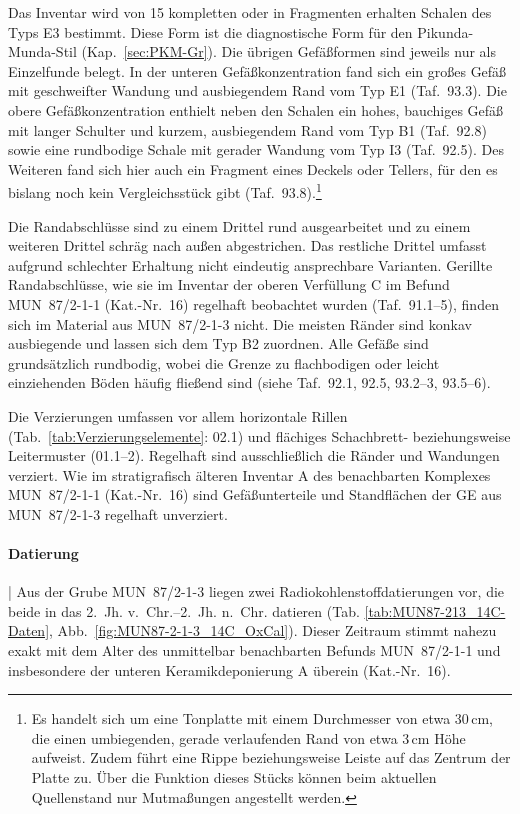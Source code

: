 Das Inventar wird von 15 kompletten oder in Fragmenten erhalten Schalen des Typs E3 bestimmt. Diese Form ist die diagnostische Form für den Pikunda-Munda-Stil (Kap.~\ref{sec:PKM-Gr}). Die übrigen Gefäßformen sind jeweils nur als Einzelfunde belegt. In der unteren Gefäßkonzentration fand sich ein großes Gefäß mit geschweifter Wandung und ausbiegendem Rand vom Typ E1 (Taf.~93.3). Die obere Gefäßkonzentration enthielt neben den Schalen ein hohes, bauchiges Gefäß mit langer Schulter und kurzem, ausbiegendem Rand vom Typ B1 (Taf.~92.8) sowie eine rundbodige Schale mit gerader Wandung vom Typ I3 (Taf.~92.5). Des Weiteren fand sich hier auch ein Fragment eines Deckels oder Tellers, für den es bislang noch kein Vergleichsstück gibt (Taf.~93.8).\footnote{Es handelt sich um eine Tonplatte mit einem Durchmesser von etwa 30\,cm, die einen umbiegenden, gerade verlaufenden Rand von etwa 3\,cm Höhe aufweist. Zudem führt eine Rippe beziehungsweise Leiste auf das Zentrum der Platte zu. Über die Funktion dieses Stücks können beim aktuellen Quellenstand nur Mutmaßungen angestellt werden.}

Die Randabschlüsse sind zu einem Drittel rund ausgearbeitet und zu einem weiteren Drittel schräg nach außen abgestrichen. Das restliche Drittel umfasst aufgrund schlechter Erhaltung nicht eindeutig ansprechbare Varianten. Gerillte Randabschlüsse, wie sie im Inventar der oberen Verfüllung C im Befund MUN~87/2-1-1 (Kat.-Nr.~16) regelhaft beobachtet wurden (Taf.~91.1--5), finden sich im Material aus MUN~87/2-1-3 nicht. Die meisten Ränder sind konkav ausbiegende und lassen sich dem Typ B2 zuordnen. Alle Gefäße sind grundsätzlich rundbodig, wobei die Grenze zu flachbodigen oder leicht einziehenden Böden häufig fließend sind (siehe Taf.~92.1, 92.5, 93.2--3, 93.5--6).

Die Verzierungen umfassen vor allem horizontale Rillen (Tab.~\ref{tab:Verzierungselemente}: 02.1) und flächiges Schachbrett- beziehungsweise Leitermuster (01.1--2). Regelhaft sind ausschließlich die Ränder und Wandungen verziert. Wie im stratigrafisch älteren Inventar A des benachbarten Komplexes MUN~87/2-1-1 (Kat.-Nr.~16) sind Gefäßunterteile und Standflächen der GE aus MUN~87/2-1-3 regelhaft unverziert.

\paragraph{Datierung}\hspace{-.5em}|\hspace{.5em}%
Aus der Grube MUN~87/2-1-3 liegen zwei Radiokohlenstoffdatierungen vor, die beide in das 2.~Jh. v.~Chr.--2.~Jh. n.~Chr. datieren (Tab. \ref{tab:MUN87-213_14C-Daten}, Abb.~\ref{fig:MUN87-2-1-3_14C_OxCal}). Dieser Zeitraum stimmt nahezu exakt mit dem Alter des unmittelbar benachbarten Befunds MUN~87/2-1-1 und insbesondere der unteren Keramikdeponierung A überein (Kat.-Nr.~16).


